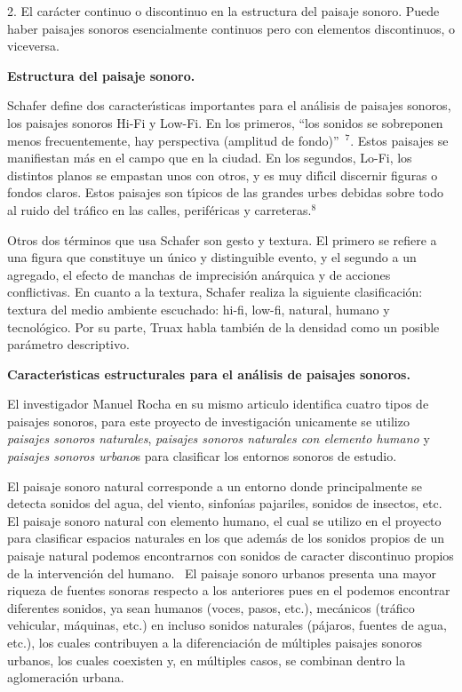2. El car\'{a}cter continuo o discontinuo en la estructura del paisaje sonoro.
Puede haber paisajes sonoros esencialmente continuos pero con elementos
discontinuos, o viceversa.

\textbf{ Estructura del paisaje sonoro.}

Schafer define dos caracter\'{\i}sticas importantes para el an\'{a}lisis de
paisajes sonoros, los paisajes sonoros Hi-Fi y Low-Fi. En los primeros,
\textquotedblleft los sonidos se sobreponen menos frecuentemente, hay
perspectiva (amplitud de fondo)\textquotedblright\ $^{7}$. Estos paisajes se
manifiestan m\'{a}s en el campo que en la ciudad. En los segundos, Lo-Fi, los
distintos planos se empastan unos con otros, y es muy dif\'{\i}cil discernir
figuras o fondos claros. Estos paisajes son t\'{\i}picos de las grandes urbes
debidas sobre todo al ruido del tr\'{a}fico en las calles, perif\'{e}ricas y
carreteras.$^{8}$

Otros dos t\'{e}rminos que usa Schafer son gesto y textura. El primero se
refiere a una figura que constituye un \'{u}nico y distinguible evento, y el
segundo a un agregado, el efecto de manchas de imprecisi\'{o}n an\'{a}rquica y
de acciones conflictivas. En cuanto a la textura, Schafer realiza la siguiente
clasificaci\'{o}n: textura del medio ambiente escuchado: hi-fi, low-fi,
natural, humano y tecnol\'{o}gico. Por su parte, Truax habla tambi\'{e}n de la
densidad como un posible par\'{a}metro descriptivo.

\textbf{ Caracter\'{\i}sticas estructurales para el an\'{a}lisis de
paisajes sonoros. }

El investigador Manuel Rocha en su mismo articulo identifica cuatro tipos de
paisajes sonoros, para este proyecto de investigaci\'{o}n unicamente se
utilizo \textit{paisajes sonoros naturales}, \textit{paisajes sonoros
naturales con elemento humano} y \textit{paisajes sonoros urbano}s para
clasificar los entornos sonoros de estudio.

El paisaje sonoro natural corresponde a un entorno donde principalmente se
detecta sonidos del agua, del viento, sinfon\'{\i}as pajariles, sonidos de
insectos, etc. El paisaje sonoro natural con elemento humano, el cual se
utilizo en el proyecto para clasificar espacios naturales en los que
adem\'{a}s de los sonidos propios de un paisaje natural podemos encontrarnos
con sonidos de caracter discontinuo propios de la intervenci\'{o}n del humano.
\ El paisaje sonoro urbanos presenta una mayor riqueza de fuentes sonoras
respecto a los anteriores pues en el podemos encontrar diferentes sonidos, ya
sean humanos (voces, pasos, etc.), mec\'{a}nicos (tr\'{a}fico vehicular,
m\'{a}quinas, etc.) en incluso sonidos naturales (p\'{a}jaros, fuentes de
agua, etc.), los cuales contribuyen a la diferenciaci\'{o}n de m\'{u}ltiples
paisajes sonoros urbanos, los cuales coexisten y, en m\'{u}ltiples casos, se
combinan dentro la aglomeraci\'{o}n urbana.

